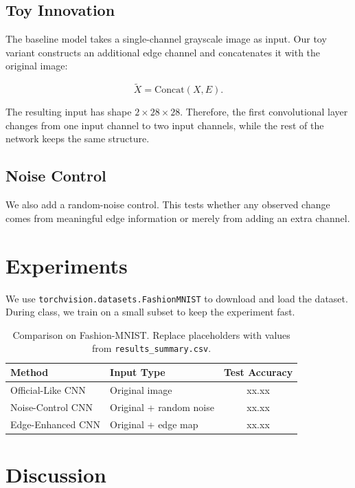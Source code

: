 \documentclass[10pt,conference]{IEEEtran}
\begin{document}
\subsection{Toy Innovation}

The baseline model takes a single-channel grayscale image as input. Our toy variant constructs an additional edge channel and concatenates it with the original image:

\begin{equation}
\tilde{X} = \mathrm{Concat}(X, E).
\end{equation}

The resulting input has shape $2 \times 28 \times 28$. Therefore, the first convolutional layer changes from one input channel to two input channels, while the rest of the network keeps the same structure.

\subsection{Noise Control}

We also add a random-noise control. This tests whether any observed change comes from meaningful edge information or merely from adding an extra channel.

\section{Experiments}

We use \texttt{torchvision.datasets.FashionMNIST} to download and load the dataset. During class, we train on a small subset to keep the experiment fast.

\begin{table}[t]
\centering
\caption{Comparison on Fashion-MNIST. Replace placeholders with values from \texttt{results\_summary.csv}.}
\label{tab:results}
\begin{tabular}{llc}
\toprule
Method & Input Type & Test Accuracy \\
\midrule
Official-Like CNN & Original image & xx.xx \\
Noise-Control CNN & Original + random noise & xx.xx \\
Edge-Enhanced CNN & Original + edge map & xx.xx \\
\bottomrule
\end{tabular}
\end{table}

\section{Discussion}
\end{document}

